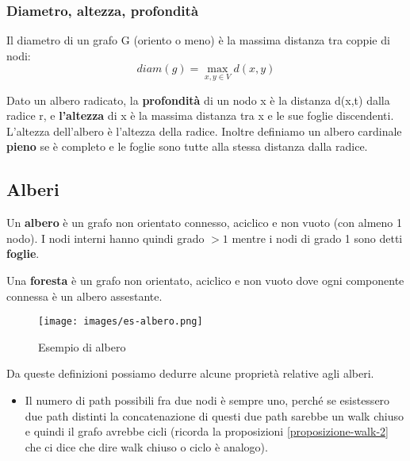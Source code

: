 \subsubsection{Diametro, altezza, profondità}
\begin{definition}
    Il diametro di un grafo G (oriento o meno) è la massima distanza tra coppie di nodi:
    \[diam(g) = \max_{x,y \in V}d(x,y)\]
\end{definition}

\begin{definition}
    Dato un albero radicato, la \textbf{profondità} di un nodo x è la distanza d(x,t) dalla radice r, e \textbf{l'altezza} di x è la massima distanza tra x e le sue foglie discendenti. L'altezza dell'albero è l'altezza della radice. Inoltre definiamo un albero cardinale \textbf{pieno} se è completo e le foglie sono tutte alla stessa distanza dalla radice.
\end{definition}



\newpage
\subsection{Alberi}
\begin{definition}
    Un \textbf{albero} è un grafo non orientato connesso, aciclico e non vuoto (con almeno 1 nodo).
    I nodi interni hanno quindi grado $>1$ mentre i nodi di grado 1 sono detti \textbf{foglie}.
\end{definition}

\begin{definition}[Foresta]
    Una \textbf{foresta} è un grafo non orientato, aciclico e non vuoto dove ogni componente connessa è un albero assestante.
\end{definition}

\begin{wrapfigure}[7]{r}{7cm}
    \vspace{-23pt}
    \centering
    \texttt{[image: images/es-albero.png]}
    \vspace{-5pt}
    \caption{Esempio di albero}
\end{wrapfigure}
\hspace{-15pt}Da queste definizioni possiamo dedurre alcune proprietà relative agli alberi.
\begin{itemize}
    \item Il numero di path possibili fra due nodi è sempre uno, perché se esistessero due path distinti la concatenazione di questi due path sarebbe un walk chiuso e quindi il grafo avrebbe cicli (ricorda la proposizioni \ref{proposizione-walk-2} che ci dice che dire walk chiuso o ciclo è analogo).
\end{itemize}


